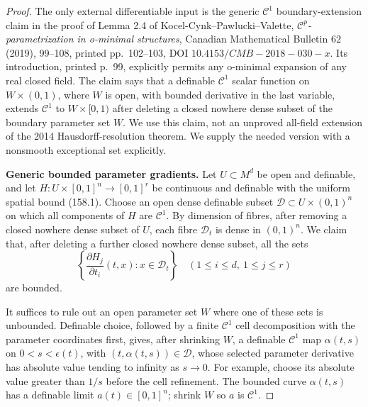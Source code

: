 \begin{proof}
The only external differentiable input is the generic
\(\mathcal C^1\) boundary-extension claim in the proof of Lemma 2.4 of
Kocel-Cynk--Pawlucki--Valette,
\emph{\(\mathcal C^p\)-parametrization in o-minimal structures},
Canadian Mathematical Bulletin 62 (2019), 99--108,
printed pp.~102--103, DOI \(10.4153/CMB-2018-030-x\).
Its introduction, printed p.~99, explicitly permits any o-minimal
expansion of any real closed field. The claim says that a definable
\(\mathcal C^1\) scalar function on \(W\times(0,1)\), where \(W\) is
open, with bounded derivative in the last variable, extends
\(\mathcal C^1\) to \(W\times[0,1)\) after deleting a closed nowhere
dense subset of the boundary parameter set \(W\). We use this claim,
not an unproved all-field extension of the 2014 Hausdorff-resolution
theorem. We supply the needed version with a nonsmooth exceptional
set explicitly.

\textbf{Generic bounded parameter gradients.}
Let \(U\subset M^d\) be open and definable, and let
\(H:U\times[0,1]^n\to[0,1]^r\) be continuous and definable with the
uniform spatial bound (158.1). Choose an open dense definable subset
\(\mathcal D\subset U\times(0,1)^n\) on which all components of \(H\)
are \(\mathcal C^1\). By dimension of fibres, after removing a closed
nowhere dense subset of \(U\), each fibre
\(\mathcal D_t\) is dense in \((0,1)^n\).
We claim that, after deleting a further closed nowhere dense subset,
all the sets
\[
 \left\{\frac{\partial H_j}{\partial t_i}(t,x):
                   x\in\mathcal D_t\right\}
 \quad(1\le i\le d,\ 1\le j\le r)
 \tag{158.3}
\]
are bounded.

It suffices to rule out an open parameter set \(W\) where one of
these sets is unbounded. Definable choice, followed by a finite
\(\mathcal C^1\) cell decomposition with the parameter coordinates
first, gives, after shrinking \(W\), a definable \(\mathcal C^1\) map
\(\alpha(t,s)\) on \(0<s<\epsilon(t)\), with
\((t,\alpha(t,s))\in\mathcal D\), whose selected parameter derivative
has absolute value tending to infinity as \(s\to0\).
For example, choose its absolute value greater than \(1/s\) before
the cell refinement. The bounded curve \(\alpha(t,s)\) has a
definable limit \(a(t)\in[0,1]^n\); shrink \(W\) so \(a\) is
\(\mathcal C^1\).


\end{proof}
